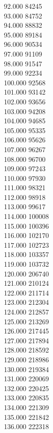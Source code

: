 { 92.000	84245 \\
 93.000	84752 \\
 94.000	88832 \\
 95.000	89184 \\
 96.000	90534 \\
 97.000	91109 \\
 98.000	91547 \\
 99.000	92234 \\
 100.000	92568 \\
 101.000	93142 \\
 102.000	93656 \\
 103.000	94208 \\
 104.000	94685 \\
 105.000	95335 \\
 106.000	95626 \\
 107.000	96267 \\
 108.000	96700 \\
 109.000	97243 \\
 110.000	97930 \\
 111.000	98321 \\
 112.000	98918 \\
 113.000	99617 \\
 114.000	100008 \\
 115.000	100396 \\
 116.000	102170 \\
 117.000	102723 \\
 118.000	103357 \\
 119.000	103732 \\
 120.000	206740 \\
 121.000	210124 \\
 122.000	211714 \\
 123.000	212304 \\
 124.000	212857 \\
 125.000	213269 \\
 126.000	217445 \\
 127.000	217894 \\
 128.000	218592 \\
 129.000	218986 \\
 130.000	219384 \\
 131.000	220069 \\
 132.000	220425 \\
 133.000	220835 \\
 134.000	221309 \\
 135.000	221842 \\
 136.000	222318 \\
}
